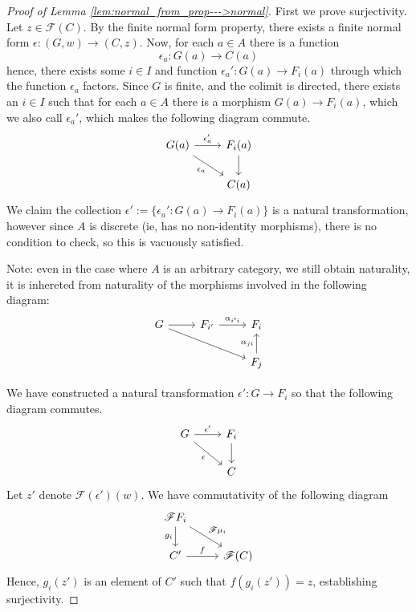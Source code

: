 \documentclass[12pt]{article}
\theoremstyle{plain}
\theoremstyle{definition}
\newcommand{\scr}[1]{\mathscr{#1}}
\newcommand{\lto}{\longrightarrow}
\begin{document}
\begin{proof}[Proof of Lemma \ref{lem:normal_from_prop--->normal}]
		First we prove surjectivity. Let $z \in \scr{F}(C)$. By the finite normal form property, there exists a finite normal form $\epsilon: (G, w) \lto (C, z)$. Now, for each $a \in A$ there is a function
		\begin{equation}
			\epsilon_a: G(a) \lto C(a)
			\end{equation}
		hence, there exists some $i \in I$ and function $\epsilon_a': G(a) \lto F_i(a)$ through which the function $\epsilon_a$ factors. Since $G$ is finite, and the colimit is directed, there exists an $i \in I$ such that for each $a \in A$ there is a morphism $G(a) \lto F_i(a)$, which we also call $\epsilon_a'$, which makes the following diagram commute.
		\begin{equation}
			\begin{tikzcd}
				G(a)\arrow[r,"{\epsilon_a'}"]\arrow[dr,swap,"{\epsilon_a}"] & F_i(a)\arrow[d]\\
				& C(a)
				\end{tikzcd}
			\end{equation}
		We claim the collection $\epsilon' := \{\epsilon_a': G(a) \lto F_i(a)\}$ is a natural transformation, however since $A$ is discrete (ie, has no non-identity morphisms), there is no condition to check, so this is vacuously satisfied.
		
		Note: even in the case where $A$ is an arbitrary category, we still obtain naturality, it is inhereted from naturality of the morphisms involved in the following diagram:
		\begin{equation}
			\begin{tikzcd}
				G\arrow[r]\arrow[drr] & F_{i'}\arrow[r,"{\alpha_{i'i}}"] & F_i\\
				& & F_j\arrow[u,"{\alpha_{ji}}"]
				\end{tikzcd}
			\end{equation}
		
		We have constructed a natural transformation $\epsilon': G \lto F_i$ so that the following diagram commutes.
		\begin{equation}
			\begin{tikzcd}
				G\arrow[r,"{\epsilon'}"]\arrow[dr,swap,"{\epsilon}"] & F_i\arrow[d]\\
				& C
				\end{tikzcd}
			\end{equation}
		Let $z'$ denote $\scr{F}(\epsilon')(w)$. We have commutativity of the following diagram
		\begin{equation}
			\begin{tikzcd}
				\scr{F}F_i\arrow[d,swap,"{g_i}"]\arrow[dr,"{\scr{F}\mu_i}"]\\
				C'\arrow[r,"{f}"] & \scr{F} (C)
				\end{tikzcd}
			\end{equation}
		Hence, $g_i(z')$ is an element of $C'$ such that $f(g_i(z')) = z$, establishing surjectivity.
		

\end{proof}
\end{document}
